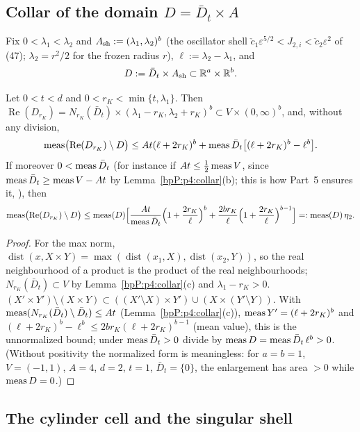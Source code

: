 \subsection{Collar of the domain $D=\bar D_t\times A$}\label{bpP:p4:s-domain}

Fix $0<\lambda_1<\lambda_2$ and $A_{\rm sh}:=(\lambda_1,\lambda_2)^b$ (the oscillator shell $\check c_1\varepsilon^{5/2}<J_{2,i}<\check c_2\varepsilon^2$ of (47); $\lambda_2=r^2/2$ for the frozen radius $r$), $\ell:=\lambda_2-\lambda_1$, and
\[D:=\bar D_t\times A_{\rm sh}\subset\mathbb{R}^a\times\mathbb{R}^b.\]

\begin{lemma}[Enlargement of $D$]\label{bpP:p4:domain-collar}
Let $0<t<d$ and $0<r_K<\min\{t,\lambda_1\}$. Then $\operatorname{Re}(D_{r_K})=N_{r_K}(\bar D_t)\times(\lambda_1-r_K,\lambda_2+r_K)^b\subset V\times(0,\infty)^b$, and, without any division,\[\operatorname{meas}\bigl(\operatorname{Re}(D_{r_K})\setminus D\bigr)\le At(\ell+2r_K)^b+\operatorname{meas}\bar D_t\bigl[(\ell+2r_K)^b-\ell^b\bigr].\]If moreover $0<\operatorname{meas}\bar D_t$ (for instance if $At\le\frac12\operatorname{meas} V$, since $\operatorname{meas}\bar D_t\ge\operatorname{meas} V-At$ by Lemma~\ref{bpP:p4:collar}(b); this is how Part~5 ensures it, ), then
\[\operatorname{meas}\bigl(\operatorname{Re}(D_{r_K})\setminus D\bigr)\le\operatorname{meas}(D)\Bigl[\frac{At}{\operatorname{meas}\bar D_t}\Bigl(1+\frac{2r_K}\ell\Bigr)^b+\frac{2br_K}{\ell}\Bigl(1+\frac{2r_K}\ell\Bigr)^{b-1}\Bigr]=:\operatorname{meas}(D)\,\eta_2.\]
\end{lemma}
\begin{proof}
\label{stepP:p4:dc-prod}
For the max norm, $\operatorname{dist}(x,X\times Y)=\max(\operatorname{dist}(x_1,X),\operatorname{dist}(x_2,Y))$, so the real neighbourhood of a product is the product of the real neighbourhoods; $N_{r_K}(\bar D_t)\subset V$ by Lemma~\ref{bpP:p4:collar}(c) and $\lambda_1-r_K>0$.
\label{stepP:p4:dc-diff}
$(X'\times Y')\setminus(X\times Y)\subset((X'\setminus X)\times Y')\cup(X\times(Y'\setminus Y))$. With $\operatorname{meas}(N_{r_K}(\bar D_t)\setminus\bar D_t)\le At$ (Lemma~\ref{bpP:p4:collar}(c)), $\operatorname{meas} Y'=(\ell+2r_K)^b$ and $(\ell+2r_K)^b-\ell^b\le2br_K(\ell+2r_K)^{b-1}$ (mean value), this is the unnormalized bound; under $\operatorname{meas}\bar D_t>0$ divide by $\operatorname{meas} D=\operatorname{meas}\bar D_t\,\ell^b>0$. (Without positivity the normalized form is meaningless: for $a=b=1$, $V=(-1,1)$, $A=4$, $d=2$, $t=1$, $\bar D_t=\{0\}$, the enlargement has area $>0$ while $\operatorname{meas} D=0$.)
\end{proof}

\subsection{The cylinder cell and the singular shell}\label{bpP:p4:s-disc}

